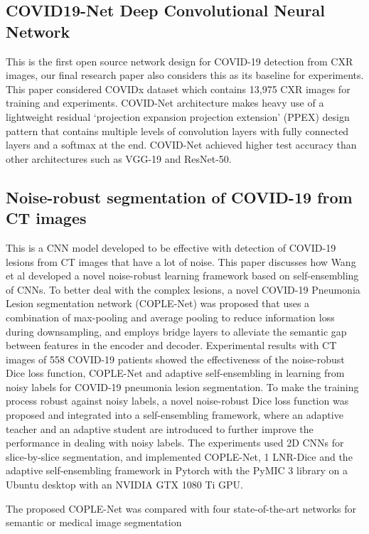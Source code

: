 \documentclass{sigkddExp}
\begin{document}
\subsection{COVID19-Net Deep Convolutional Neural Network}

This is the first open source network design for COVID-19 detection from CXR images,
our final research paper also considers this as its baseline for experiments.
This paper considered COVIDx dataset which contains 13,975 CXR images for training and
experiments. COVID-Net architecture makes heavy use of a lightweight residual
‘projection expansion projection extension’ (PPEX) design pattern that contains multiple
levels of convolution layers with fully connected layers and a softmax at the end.
COVID-Net achieved higher test accuracy than other architectures such as VGG-19 and ResNet-50.

\subsection{Noise-robust segmentation of COVID-19 from CT images}

This is a CNN model \cite{wang2020covidnet} developed to be effective with
detection of COVID-19 lesions from CT images that have a lot of noise. This
paper discusses how Wang et al developed a novel noise-robust learning framework
based on self-ensembling of CNNs.  To better deal with the complex lesions, a
novel COVID-19 Pneumonia Lesion segmentation network (COPLE-Net) was proposed
that uses a combination of max-pooling and average pooling to reduce information
loss during downsampling, and employs bridge layers to alleviate the semantic
gap between features in the encoder and decoder. Experimental results with CT
images of 558 COVID-19 patients showed the effectiveness of the noise-robust
Dice loss function, COPLE-Net and adaptive self-ensembling in learning from
noisy labels for COVID-19 pneumonia lesion segmentation. To make the training
process robust against noisy labels, a novel noise-robust Dice loss function was
proposed and integrated into a self-ensembling framework, where an adaptive
teacher and an adaptive student are introduced to further improve the
performance in dealing with noisy labels. The experiments used 2D CNNs for
slice-by-slice segmentation, and implemented COPLE-Net, 1 LNR-Dice and the
adaptive self-ensembling framework in Pytorch with the PyMIC 3 library on a
Ubuntu desktop with an NVIDIA GTX 1080 Ti GPU. 

The proposed COPLE-Net was compared with four state-of-the-art networks for semantic or medical
image segmentation
\end{document}
